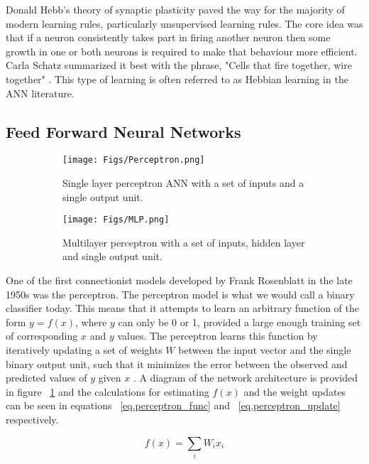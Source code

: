 Donald Hebb's theory of synaptic plasticity \citep{hebb} paved the way for the majority of 
modern learning rules, particularly unsupervised learning rules.
The core idea was that if a neuron consistently takes part in firing 
another neuron then some growth in one or 
both neurons is required to make that behaviour more efficient. 
Carla Schatz summarized it best with the phrase,
"Cells that fire together, wire together" \citep{neurons-wire}. 
This type of learning is often referred to as Hebbian learning 
in the \ac{ANN} literature.

\subsection{Feed Forward Neural Networks}

\begin{figure}[!h]
\centering
\begin{subfigure}[b]{.45\textwidth}
	\texttt{[image: Figs/Perceptron.png]}
	\caption{Single layer perceptron \ac{ANN} with a set of inputs and a single output unit.}
	\label{fig:perceptron}
\end{subfigure}
\qquad
\begin{subfigure}[b]{.45\textwidth}
	\texttt{[image: Figs/MLP.png]}
	\caption{Multilayer perceptron with a set of inputs, hidden layer and single output unit.}
	\label{fig:mlp}
\end{subfigure}
\label{fig:perceptrons}
\caption{}
\end{figure}

One of the first connectionist models developed by Frank Rosenblatt in the late 1950s was the perceptron. 
The perceptron model is what we would call a binary classifier today. 
This means that it attempts to learn an 
arbitrary function of the form $y = f(x)$, where $y$ can only be 0 or 1,
provided a large enough training set of corresponding $x$ and $y$ values.
The perceptron learns this function by iteratively updating a set of 
weights $W$ between the input vector and the single binary 
output unit, such that it minimizes the error between the observed and predicted 
values of $y$ given $x$ \citep{perceptrons-62}. 
A diagram of the network architecture is provided in figure ~\ref{fig:perceptron} 
and the calculations for estimating $f(x)$ and the weight 
updates can be seen in equations ~\ref{eq.perceptron_func} 
and ~\ref{eq.perceptron_update} respectively.

\begin{equation}
f(x) = \sum_{i} W_{i}x_{i} \label{eq.perceptron_func}
\end{equation}

